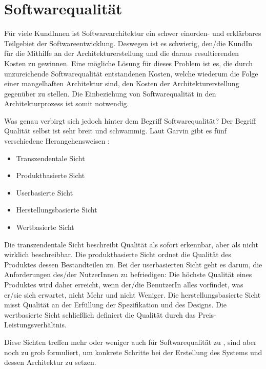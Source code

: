 \chapter{Softwarequalität}
Für viele KundInnen ist Softwarearchitektur ein schwer einorden- und erklärbares Teilgebiet der Softwareentwicklung. Deswegen ist es schwierig, den/die KundIn für die Mithilfe an der Architekturerstellung und die daraus resultierenden Kosten zu gewinnen. Eine mögliche Lösung für dieses Problem ist es, die durch unzureichende Softwarequalität entstandenen Kosten, welche wiederum die Folge einer mangelhaften Architektur sind, den Kosten der Architekturerstellung gegenüber zu stellen. Die Einbeziehung von Softwarequalität in den Architekturprozess ist somit notwendig. \cite[S. 8-9]{softarch}

Was genau verbirgt sich jedoch hinter dem Begriff Softwarequalität? Der Begriff Qualität selbst ist sehr breit und schwammig. Laut Garvin gibt es fünf verschiedene Herangehensweisen \cite[S. 25-29]{quality}:

\begin{itemize}
  \item Transzendentale Sicht
  \item Produktbasierte Sicht
  \item Userbasierte Sicht
  \item Herstellungsbasierte Sicht
  \item Wertbasierte Sicht
\end{itemize}

Die transzendentale Sicht beschreibt Qualität als sofort erkennbar, aber als nicht wirklich beschreibbar. Die produktbasierte Sicht ordnet die Qualität des Produktes dessen Bestandteilen zu. Bei der userbasierten Sicht geht es darum, die Anforderungen des/der NutzerInnen zu befriedigen: Die höchste Qualität eines Produktes wird daher erreicht, wenn der/die BenutzerIn alles vorfindet, was er/sie sich erwartet, nicht Mehr und nicht Weniger. Die herstellungsbasierte Sicht misst Qualität an der Erfüllung der Spezifikation und des Designs. Die wertbasierte Sicht schließlich definiert die Qualität durch das Preis-Leistungsverhältnis. \cite[S. 26]{quality}

Diese Sichten treffen mehr oder weniger auch für Softwarequalität zu \cite[S. 399]{pract}, sind aber noch zu grob formuliert, um konkrete Schritte bei der Erstellung des Systems und dessen Architektur zu setzen.

